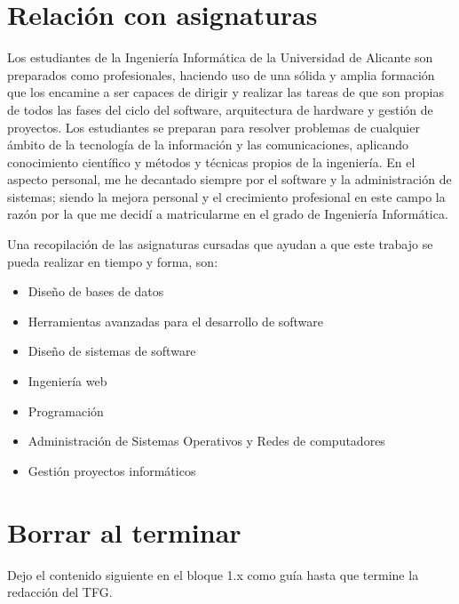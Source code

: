 \section{Relación con asignaturas}
Los estudiantes de la Ingeniería Informática de la Universidad de Alicante son preparados como profesionales, haciendo uso de una sólida y amplia formación que los encamine a ser capaces de dirigir y realizar las tareas de que son propias de todos las fases del ciclo del software, arquitectura de hardware y gestión de proyectos. Los estudiantes se preparan para resolver problemas de cualquier ámbito de la tecnología de la información y las comunicaciones, aplicando conocimiento científico y métodos y técnicas propios de la ingeniería.
En el aspecto personal, me he decantado siempre por el software y la administración de sistemas; siendo la mejora personal y el crecimiento profesional en este campo la razón por la que me decidí a matricularme en el grado de Ingeniería Informática.
\vspace{1em}
\par Una recopilación de las asignaturas cursadas que ayudan a que este trabajo se pueda realizar en tiempo y forma, son:
\begin{itemize}
    \item Diseño de bases de datos
    \item Herramientas avanzadas para el desarrollo de software
    \item Diseño de sistemas de software
    \item Ingeniería web
    \item Programación
    \item Administración de Sistemas Operativos y Redes de computadores
    \item Gestión proyectos informáticos
\end{itemize}

\section{Borrar al terminar}
Dejo el contenido siguiente en el bloque 1.x como guía hasta que termine la redacción del TFG.

